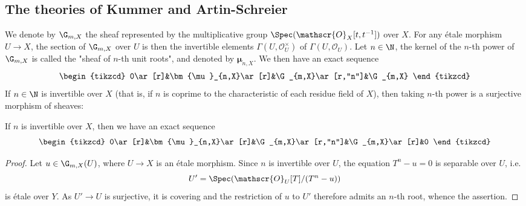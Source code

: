 \subsection{The theories of Kummer and Artin-Schreier}
We denote by $\G_{m,X}$ the sheaf represented by the multiplicative group $\Spec(\mathscr{O}_X[t,t^{-1}])$ over $X$. For any \'etale morphism $U\to X$, the section of $\G_{m,X}$ over $U$ is then the invertible elements $\Gamma(U,\mathscr{O}_U^\times)$ of $\Gamma(U,\mathscr{O}_U)$. Let $n\in\N$, the kernel of the $n$-th power of $\G_{m,X}$ is called the "sheaf of $n$-th unit roots", and denoted by $\bm{\mu}_{n,X}$. We then have an exact sequence
\begin{equation}\label{scheme etale Kummer exact sequence-1}
\begin{tikzcd}
0\ar[r]&\bm{\mu}_{n,X}\ar[r]&\G_{m,X}\ar[r,"n"]&\G_{m,X}  
\end{tikzcd}
\end{equation}
If $n\in\N$ is invertible over $X$ (that is, if $n$ is coprime to the characteristic of each residue field of $X$), then taking $n$-th power is a surjective morphism of sheaves:
\begin{theorem}\label{scheme etale Kummer exact sequence}
If $n$ is invertible over $X$, then we have an exact sequence
\begin{equation}\label{scheme etale Kummer exact sequence-2}
\begin{tikzcd}
0\ar[r]&\bm{\mu}_{n,X}\ar[r]&\G_{m,X}\ar[r,"n"]&\G_{m,X}\ar[r]&0
\end{tikzcd}
\end{equation}
\end{theorem}
\begin{proof}
Let $u\in\G_{m,X}(U)$, where $U\to X$ is an \'etale morphism. Since $n$ is invertible over $U$, the equation $T^n-u=0$ is separable over $U$, i.e.
\[U'=\Spec(\mathscr{O}_U[T]/(T^n-u))\]
is \'etale over $Y$. As $U'\to U$ is surjective, it is covering and the restriction of $u$ to $U'$ therefore admits an $n$-th root, whence the assertion.
\end{proof}

